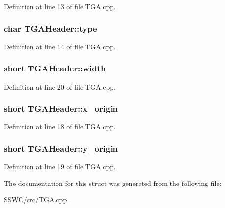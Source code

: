 Definition at line 13 of file T\+G\+A.\+cpp.

\hypertarget{struct_t_g_a_header_ae100ea914ad090f7878a2cae04b39640}{
\subsubsection[{type}]{\setlength{\rightskip}{0pt plus 5cm}char T\+G\+A\+Header\+::type}}\label{struct_t_g_a_header_ae100ea914ad090f7878a2cae04b39640}


Definition at line 14 of file T\+G\+A.\+cpp.

\hypertarget{struct_t_g_a_header_a4ecf23c7b373b578053daed7640919b9}{
\subsubsection[{width}]{\setlength{\rightskip}{0pt plus 5cm}short T\+G\+A\+Header\+::width}}\label{struct_t_g_a_header_a4ecf23c7b373b578053daed7640919b9}


Definition at line 20 of file T\+G\+A.\+cpp.

\hypertarget{struct_t_g_a_header_a3a210fd7133b1443977ecbed3974516e}{
\subsubsection[{x\+\_\+origin}]{\setlength{\rightskip}{0pt plus 5cm}short T\+G\+A\+Header\+::x\+\_\+origin}}\label{struct_t_g_a_header_a3a210fd7133b1443977ecbed3974516e}


Definition at line 18 of file T\+G\+A.\+cpp.

\hypertarget{struct_t_g_a_header_a5dad60cc55161642e2e5b469da05433b}{
\subsubsection[{y\+\_\+origin}]{\setlength{\rightskip}{0pt plus 5cm}short T\+G\+A\+Header\+::y\+\_\+origin}}\label{struct_t_g_a_header_a5dad60cc55161642e2e5b469da05433b}


Definition at line 19 of file T\+G\+A.\+cpp.



The documentation for this struct was generated from the following file\+:\begin{DoxyCompactItemize}
\item 
S\+S\+W\+C/src/\hyperlink{_t_g_a_8cpp}{T\+G\+A.\+cpp}\end{DoxyCompactItemize}
